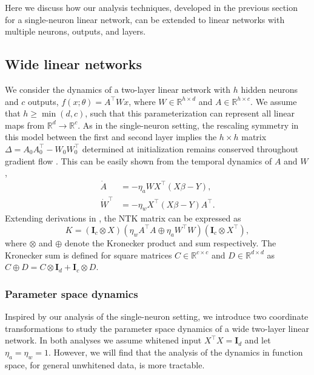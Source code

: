 \documentclass{article}
\theoremstyle{plain}
\theoremstyle{definition}
\theoremstyle{remark}
\begin{document}
Here we discuss how our analysis techniques, developed in the previous section for a single-neuron linear network, can be extended to linear networks with multiple neurons, outputs, and layers.


\subsection{Wide linear networks}

We consider the dynamics of a two-layer linear network with $h$ hidden neurons and $c$ outputs, $f(x;\theta) = A^\intercal W x$, where $W \in \mathbb{R}^{h \times d}$ and $A \in \mathbb{R}^{h \times c}$.
%
We assume that $h \ge \min(d,c)$, such that this parameterization can represent all linear maps from $\mathbb{R}^d \to \mathbb{R}^c$.
%
As in the single-neuron setting, the rescaling symmetry in this model between the first and second layer implies the $h \times h$ matrix $\Delta =  A_0A_0^\intercal - W_0W_0^\intercal$ determined at initialization remains conserved throughout gradient flow \cite{du2018algorithmic}.
%
This can be easily shown from the temporal dynamics of $A$ and $W$,
\begin{align}
    \label{eq:ODE-A-wide}
    \dot{A} &= - \eta_a W X^{\intercal} (X \beta -Y),\\
    \label{eq:ODE-W-wide}
    \dot{W}^{\intercal} &= -\eta_wX^\intercal (X\beta -Y)A^{\intercal}.
\end{align}
%
Extending derivations in \cite{braun2022exact}, the NTK matrix can be expressed as 
\begin{equation}
    K = \left(\mathbf{I}_{c} \otimes X\right)\left(\eta_w A^{\intercal}A \oplus \eta_a W^{\intercal}W\right)\left(\mathbf{I}_{c} \otimes X^\intercal\right),
\end{equation}
where $\otimes$ and $\oplus$ denote the Kronecker product and sum respectively.
%
The Kronecker sum is defined for square matrices $C \in \mathbb{R}^{c \times c}$ and $D \in \mathbb{R}^{d \times d}$ as $C \oplus D = C \otimes \mathbf{I}_{d} + \mathbf{I}_{c} \otimes D$.

\subsubsection{Parameter space dynamics}

Inspired by our analysis of the single-neuron setting, we introduce two coordinate transformations to study the parameter space dynamics of a wide two-layer linear network.
%
In both analyses we assume whitened input $X^\intercal X = \mathbf{I}_d$ and let $\eta_a = \eta_w = 1$.
%
However, we will find that the analysis of the dynamics in function space, for general unwhitened data, is more tractable.
\end{document}
